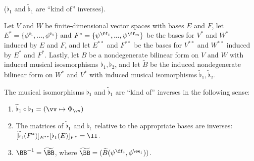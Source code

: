 \begin{theorem}
    \label{ch::bilinear_forms_metric_tensors::thm::B_Btilde_kind_of_inverses}
    ($\flat_1$ and $\widetilde{\flat}_1$ are ``kind of'' inverses).
    
    Let $V$ and $W$ be finite-dimensional vector spaces with bases $E$ and $F$, let $E^* = \{\phi^{\ee_1}, ..., \phi^{\ee_n}\}$ and $F^* = \{\psi^{\ff_1}, ..., \psi^{\ff_m}\}$ be the bases for $V^*$ and $W^*$ induced by $E$ and $F$, and let $E^{**}$ and $F^{**}$ be the bases for $V^{**}$ and $W^{**}$ induced by $E^*$ and $F^*$. Lastly, let $B$ be a nondegenerate bilinear form on $V$ and $W$ with induced musical isosmorphisms $\flat_1, \flat_2$, and let $\widetilde{B}$ be the induced nondegenerate bilinear form on $W^*$ and $V^*$ with induced musical isomorphisms $\widetilde{\flat}_1, \widetilde{\flat}_2$.
    
    The musical isomorphisms $\flat_1$ and $\widetilde{\flat}_1$ are ``kind of'' inverses in the following sense:
     
    \begin{enumerate}
         \item $\widetilde{\flat}_1 \circ \flat_1 = (\vv \mapsto \Phi_\vv)$
        \item The matrices of $\widetilde{\flat}_1$ and $\flat_1$ relative to the appropriate bases are inverses: $[\widetilde{\flat}_1(F^*)]_{E^{**}} [\flat_1(E)]_{F^*} = \II$.
        \item $\BB^{-1} = \widetilde{\BB}$, where $\widetilde{\BB} = (\widetilde{B}(\psi^{\ff_i}, \phi^{\ee_j}))$.
    \end{enumerate}
\end{theorem}
 
